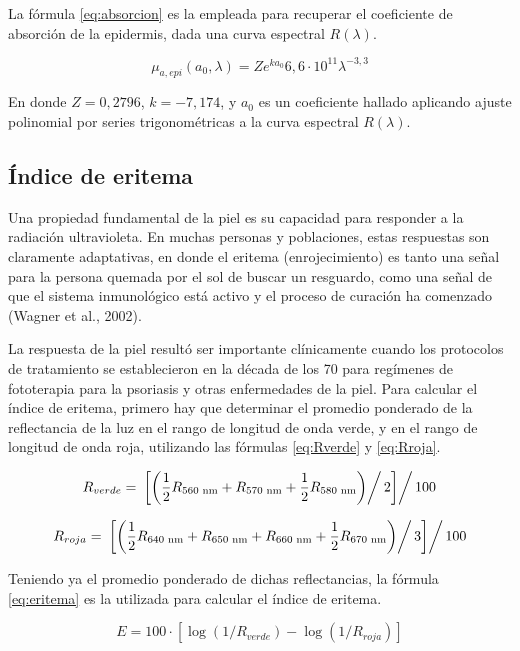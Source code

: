 		La f\'{o}rmula \ref{eq:absorcion} es la empleada para recuperar el coeficiente de absorci\'{o}n de la epidermis, dada una curva espectral $R(\lambda)$.
		
		\begin{equation}\label{eq:absorcion}
			\mu_{a,epi}(a_{0}, \lambda)=Ze^{ka_{0}}6,6 \cdot 10^{11}\lambda^{-3,3}
		\end{equation}
		
		En donde $Z=0,2796$, $k=-7,174$, y $a_{0}$ es un coeficiente hallado aplicando ajuste polinomial por series trigonom\'{e}tricas a la curva espectral $R(\lambda)$.
	
	\subsection{\'{I}ndice de eritema}
	
		Una propiedad fundamental de la piel es su capacidad para responder a la radiaci\'{o}n ultravioleta. En muchas personas y poblaciones, estas respuestas son claramente adaptativas, en donde el eritema (enrojecimiento) es tanto una se\~{n}al para la persona quemada por el sol de buscar un resguardo, como una se\~{n}al de que el sistema inmunol\'{o}gico est\'{a} activo y el proceso de curaci\'{o}n ha comenzado (Wagner et al., 2002). 
		
		La respuesta de la piel result\'{o} ser importante cl\'{i}nicamente cuando los protocolos de tratamiento se establecieron en la d\'{e}cada de los 70 para reg\'{i}menes de fototerapia para la psoriasis y otras enfermedades de la piel. Para calcular el \'{i}ndice de eritema, primero hay que determinar el promedio ponderado de la reflectancia de la luz en el rango de longitud de onda verde, y en el rango de longitud de onda roja, utilizando las f\'{o}rmulas \ref{eq:Rverde} y \ref{eq:Rroja}.
		
		\begin{equation}\label{eq:Rverde}
			R_{verde} = \left.\left.\left[\left(\frac{1}{2}R_{560 \text{ nm}} + R_{570 \text{ nm}} + \frac{1}{2}R_{580 \text{ nm}}\right)\right/2\right]\right/100
		\end{equation}		
		
		\begin{equation}\label{eq:Rroja}
			R_{roja} = \left.\left.\left[\left(\frac{1}{2}R_{640 \text{ nm}} + R_{650 \text{ nm}} + R_{660 \text{ nm}} + \frac{1}{2}R_{670 \text{ nm}}\right)\right/3\right]\right/100
		\end{equation}
		
		Teniendo ya el promedio ponderado de dichas reflectancias, la f\'{o}rmula \ref{eq:eritema} es la utilizada para calcular el \'{i}ndice de eritema.
		
		\begin{equation}\label{eq:eritema}
			E = 100 \cdot [\log(1/R_{verde}) - \log(1/R_{roja})]
		\end{equation}				
		